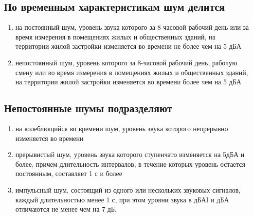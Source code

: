\documentclass[a5paper, 12dd, twoside]{article}
\begin{document}
\subsection{По временным характеристикам шум делится}
\begin{enumerate}
    \item на постоянный шум, уровень звука которого за 8-часовой рабочий день или за время измерения в помещениях жилых и общественных зданий, на территории жилой застройки изменяется во времени не более чем на 5 дБА
    \item непостоянный шум, уровень которого за 8-часовой рабочий день, рабочую смену или во время измерения в помещениях жилых и общественных зданий, на территории жилой застройки изменяется во времени более чем на 5 дБА
\end{enumerate}
\subsection{Непостоянные шумы подразделяют}
\begin{enumerate}
    \item на колеблющийся во времени шум, уровень звука которого непрерывно изменяется во времени
    \item прерывистый шум, уровень звука которого ступенчато изменяется на 5дБА и более, причем длительность интервалов, в течение которых уровень остается постоянным, составляет 1 с и более
    \item импульсный шум, состоящий из одного или нескольких звуковых сигналов, каждый длительностью менее 1 с, при этом уровни звука в дБАI и дБА отличаются не менее чем на 7 дБ.
\end{enumerate}
\end{document}
